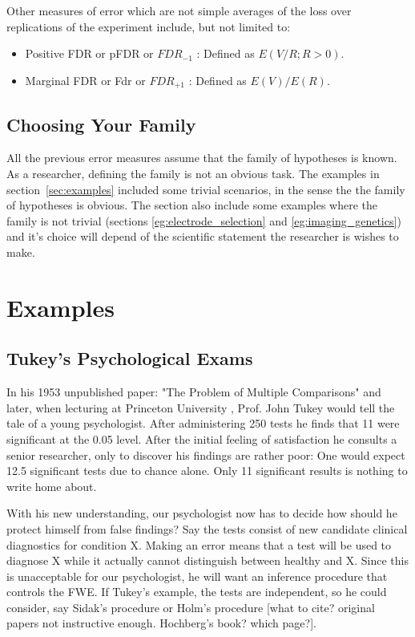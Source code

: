 \documentclass[draft,12pt]{article}
\begin{document}
Other measures of error which are not simple averages of the loss over replications of the experiment include, but not limited to:
\begin{itemize}
\item Positive FDR or pFDR \citep{storey_direct_2002} or $FDR_{-1}$ \citep{benjamini_discovering_2010} : Defined as $E(V/R;R>0)$.
\item Marginal FDR \citep{sun_oracle_2007} or Fdr \citep{efron_microarrays_2008} or $FDR_{+1}$ \citep{benjamini_discovering_2010}: Defined as $E(V)/E(R)$.
\end{itemize}




\subsection{Choosing Your Family}
All the previous error measures assume that the family of hypotheses is known. As a researcher, defining the family is not an obvious task. The examples in section~\ref{sec:examples} included some trivial scenarios, in the sense the the family of hypotheses is obvious. The section also include some examples where the family is not trivial (sections \ref{eg:electrode_selection} and \ref{eg:imaging_genetics}) and it's choice will depend of the scientific statement the researcher is wishes to make.




\section{\label{sec:examples}Examples}



\subsection{Tukey's Psychological Exams}
In his 1953 unpublished paper: "The Problem of Multiple Comparisons" \citep{benjamini_john_2002} and later, when lecturing at Princeton University \citet{donoho_higher_2004}, Prof. John Tukey would tell the tale of a young psychologist. After administering 250 tests he finds that 11 were significant at the 0.05 level. After the initial feeling of satisfaction he consults a senior researcher, only to discover his findings are rather poor: One would expect 12.5 significant tests due to chance alone. Only 11 significant results is nothing to write home about.


With his new understanding, our psychologist now has to decide how should he protect himself from false findings? 
Say the tests consist of new candidate clinical diagnostics for condition X. Making an error means that a test will be used to diagnose X while it actually cannot distinguish between healthy and X. Since this is unacceptable for our psychologist, he will want an inference procedure that controls the FWE. If Tukey's example, the tests are independent, so he could consider, say Sidak's procedure or Holm's procedure [what to cite? original papers not instructive enough. Hochberg's book? which page?].
\end{document}
